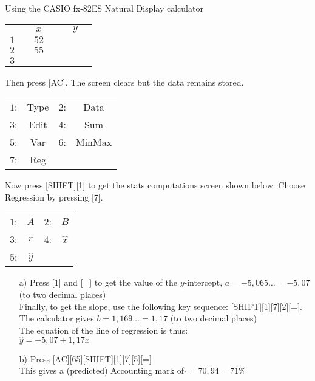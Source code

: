 \begin{wex}{Using the CASIO fx-82ES Natural Display calculator
}
{\begin{center}
\begin{tabular}{c|c c c|c c c}
 & & $x$ & & & $y$ &\\
$1$& & $52$ & & & & \\
$2$& & $55$ & & & & \\
$3$& & & & & & \\
\end{tabular}
\end{center}

Then press [AC]. The screen clears but the data remains stored.

\begin{center}
\begin{tabular}{|c c c c|}\hline
$1$: & Type & $2$: & Data \\
$3$: & Edit & $4$: & Sum \\
$5$: & Var & $6$: & MinMax \\
$7$: & Reg &  &  \\\hline
\end{tabular}
\end{center}

Now press [SHIFT][1] to get the stats computations screen shown below. Choose Regression by pressing [7].

\begin{center}
\begin{tabular}{|c c c c|}\hline
$1$: & $A$ & $2$: & $B$ \\
$3$: & $r$ & $4$: & $\hat{x}$ \\
$5$: & $\hat{y}$ & & \\ \hline
\end{tabular}
\end{center}

\begin{enumerate}

\item[a)] Press [1] and [=] to get the value of the $y$-intercept, $a = -5,065\ldots= -5,07 $ (to two decimal places)\\
Finally, to get the slope, use the following key sequence: [SHIFT][1][7][2][=]. The calculator gives $b = 1,169\ldots = 1,17$ (to two decimal places)\\

The equation of the line of regression is thus:\\
$\hat{y} =-5,07  + 1,17 x$\\

\item[b)] Press [AC][65][SHIFT][1][7][5][=]\\
 This gives a (predicted) Accounting mark of $\hat{} = 70,94 = 71$\%
\end{enumerate}

}
\end{wex}

